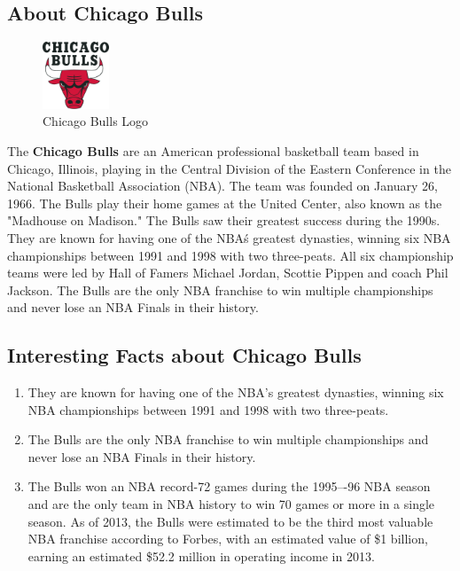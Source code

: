 \documentclass[a4paper]{article}
\begin{document}
\subsection{About Chicago Bulls}
\vspace{1cm}
\begin{figure}[ht]
\begin{center}
\includegraphics[width=2cm,height=2cm]{ChiacgoBullsLogo.png}
\end{center}
\caption{Chicago Bulls Logo}
\label{Img:ChicagoBullsLogo}
\end{figure}
\vspace{1cm}
The \textbf{Chicago Bulls} are an American professional basketball team based in Chicago, Illinois, playing in the Central Division of the Eastern Conference in the National Basketball Association (NBA). The team was founded on January 26, 1966. The Bulls play their home games at the United Center, also known as the "Madhouse on Madison." The Bulls saw their greatest success during the 1990s. They are known for having one of the NBA\'s greatest dynasties, winning six NBA championships between 1991 and 1998 with two three-peats. All six championship teams were led by Hall of Famers Michael Jordan, Scottie Pippen and coach Phil Jackson. The Bulls are the only NBA franchise to win multiple championships and never lose an NBA Finals in their history.
\vspace{1cm}
\subsection{Interesting Facts about Chicago Bulls}

\begin{enumerate}
\item They are known for having one of the NBA's greatest dynasties, winning six NBA championships between 1991 and 1998 with two three-peats.
\item The Bulls are the only NBA franchise to win multiple championships and never lose an NBA Finals in their history.
\item The Bulls won an NBA record-72 games during the 1995–-96 NBA season and are the only team in NBA history to win 70 games or more in a single season.
As of 2013, the Bulls were estimated to be the third most valuable NBA franchise according to Forbes, with an estimated value of \$1 billion, earning an estimated \$52.2 million in operating income in 2013.
\end{enumerate}
\vspace{1cm}
\end{document}
